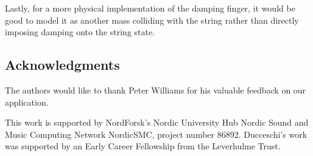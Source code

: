     Lastly, for a more physical implementation of the damping finger, it would be good to model it as another mass colliding with the string rather than directly imposing damping onto the string state.
    
    \subsection*{Acknowledgments}
    The authors would like to thank Peter Williams for his valuable feedback on our application.
    
    This work is supported by NordForsk's Nordic
    University Hub Nordic Sound and Music Computing Network
    NordicSMC, project number 86892. Ducceschi's work was supported by an Early Career Fellowship from the Leverhulme Trust.
 